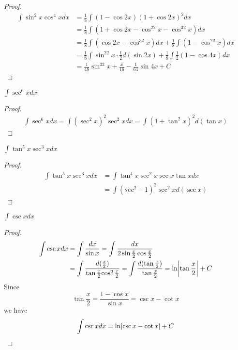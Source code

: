 \documentclass[11pt]{article}
\begin{document}
\begin{proof}
\begin{align*}
\int\sin^2x\cos^4xdx&=\frac{1}{8}\int(1-\cos2x)(1+\cos2x)^2dx\\
&=\frac{1}{8}\int(1+\cos2x-\cos^22x-\cos^32x)dx\\
&=\frac{1}{8}\int(\cos2x-\cos^32x)dx+\frac{1}{8}\int(1-\cos^22x)dx\\
&=\frac{1}{8}\int\sin^22x\cdot\frac{1}{2}d(\sin2x)+\frac{1}{8}\int\frac{1}{2}(1-\cos4x)dx\\
&=\frac{1}{48}\sin^32x+\frac{x}{16}-\frac{1}{64}\sin4x+C
\end{align*}
\end{proof}

\begin{proposition}[]
\(\int\sec^6xdx\)
\end{proposition}

\begin{proof}
\begin{align*}
\int\sec^6xdx=\int(\sec^2x)^2\sec^2xdx=\int(1+\tan^2x)^2d(\tan x)
\end{align*}
\end{proof}

\begin{proposition}[]
\(\int\tan^5x\sec^3xdx\)
\end{proposition}

\begin{proof}
\begin{align*}
\int\tan^5x\sec^3xdx&=\int\tan^4x\sec^2x\sec x\tan xdx\\
&=\int(sec^2-1)^2\sec^2xd(\sec x)
\end{align*}
\end{proof}

\begin{proposition}[]
\(\int\csc xdx\)
\end{proposition}

\begin{proof}
\begin{align*}
\int\csc xdx&=\int\frac{dx}{\sin x}=\int\frac{dx}{2\sin\frac{x}{2}\cos\frac{x}{2}}\\
&=\int\frac{d(\frac{x}{2})}{\tan{\frac{x}{2}}{\cos^2\frac{x}{2}}}=
\int\frac{d(\tan\frac{x}{2})}{\tan\frac{x}{2}}=\ln\abs{\tan\frac{x}{2}}+C
\end{align*}
Since
\begin{equation*}
\tan\frac{x}{2}=\frac{1-\cos x}{\sin x}=\csc x-\cot x
\end{equation*}
we have
\begin{equation*}
\int\csc xdx=\ln\abs{\csc x-\cot x}+C
\end{equation*}
\end{proof}
\end{document}
